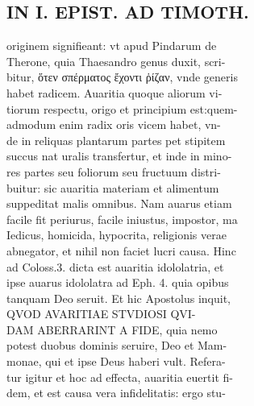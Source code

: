 \documentclass{article}
\begin{document}
\begin{pages}
\section*{IN I. EPIST. AD TIMOTH. \\
                }
originem signifieant: vt apud Pindarum de \\
                Therone, quia Thaesandro genus duxit, scri- \\
                bitur, ὅτεν σπέρματος ἔχοντι ῥίζαν, vnde generis \\
                habet radicem. Auaritia quoque aliorum vi- \\
                tiorum respectu, origo et principium est:quem- \\
                admodum enim radix oris vicem habet, vn- \\
                de in reliquas plantarum partes pet stipitem \\
                succus nat uralis transfertur, et inde in mino- \\
                res partes seu foliorum seu fructuum distri- \\
                buitur: sic auaritia materiam et alimentum \\
                suppeditat malis omnibus. Nam auarus etiam \\
                facile fit periurus, facile iniustus, impostor, ma \\
                Iedicus, homicida, hypocrita, religionis verae \\
                abnegator, et nihil non faciet lucri causa. Hinc \\
                ad Coloss.3. dicta est auaritia idololatria, et \\
                ipse auarus idololatra ad Eph. 4. quia opibus \\
                tanquam Deo seruit. Et hic Apostolus inquit, \\
                QVOD AVARITIAE STVDIOSI QVI- \\
                DAM ABERRARINT A FIDE, quia nemo \\
                potest duobus dominis seruire, Deo et Mam- \\
                monae, qui et ipse Deus haberi vult. Refera- \\
                tur igitur et hoc ad effecta, auaritia euertit fi- \\
                dem, et est causa vera infidelitatis: ergo stu- \\

\end{pages}
\end{document}
